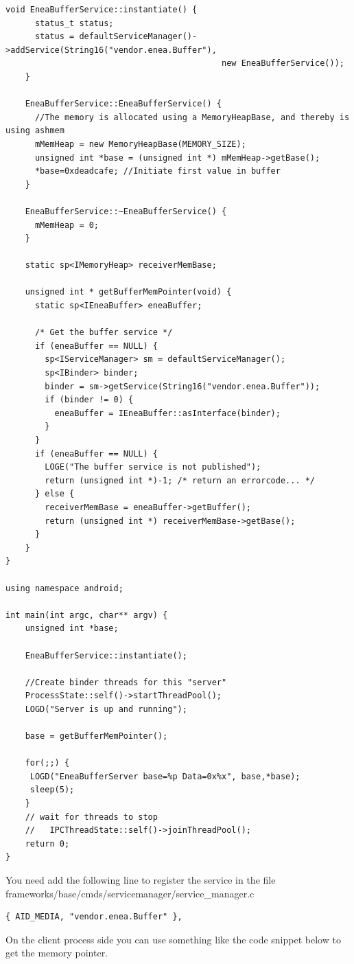 \documentclass[a4paper,11pt]{article}
\begin{document}
\begin{appendices}
\begin{lstlisting}[caption=Server command: EneaBufferServer.cpp,
    label={EneaBufferServer}]
    void EneaBufferService::instantiate() {
      status_t status;
      status = defaultServiceManager()->addService(String16("vendor.enea.Buffer"),
                                            new EneaBufferService());
    }

    EneaBufferService::EneaBufferService() {
      //The memory is allocated using a MemoryHeapBase, and thereby is using ashmem
      mMemHeap = new MemoryHeapBase(MEMORY_SIZE);
      unsigned int *base = (unsigned int *) mMemHeap->getBase();
      *base=0xdeadcafe; //Initiate first value in buffer
    }

    EneaBufferService::~EneaBufferService() {
      mMemHeap = 0;
    }

    static sp<IMemoryHeap> receiverMemBase;

    unsigned int * getBufferMemPointer(void) {
      static sp<IEneaBuffer> eneaBuffer;

      /* Get the buffer service */
      if (eneaBuffer == NULL) {
        sp<IServiceManager> sm = defaultServiceManager();
        sp<IBinder> binder;
        binder = sm->getService(String16("vendor.enea.Buffer"));
        if (binder != 0) {
          eneaBuffer = IEneaBuffer::asInterface(binder);
        }
      }
      if (eneaBuffer == NULL) {
        LOGE("The buffer service is not published");
        return (unsigned int *)-1; /* return an errorcode... */
      } else {
        receiverMemBase = eneaBuffer->getBuffer();
        return (unsigned int *) receiverMemBase->getBase();
      }
    } 
}

using namespace android;

int main(int argc, char** argv) {
    unsigned int *base; 

    EneaBufferService::instantiate();

    //Create binder threads for this "server"
    ProcessState::self()->startThreadPool();
    LOGD("Server is up and running");

    base = getBufferMemPointer(); 

    for(;;) {
     LOGD("EneaBufferServer base=%p Data=0x%x", base,*base);
     sleep(5);
    }
    // wait for threads to stop
    //   IPCThreadState::self()->joinThreadPool();
    return 0;
} 
\end{lstlisting}
You need add the following line to register the service in the file
frameworks/base/cmds/servicemanager/service_manager.c

\begin{lstlisting}
{ AID_MEDIA, "vendor.enea.Buffer" },
\end{lstlisting}
On the client process side you can use something like the code snippet below to get the memory pointer.


\end{appendices}
\end{document}
